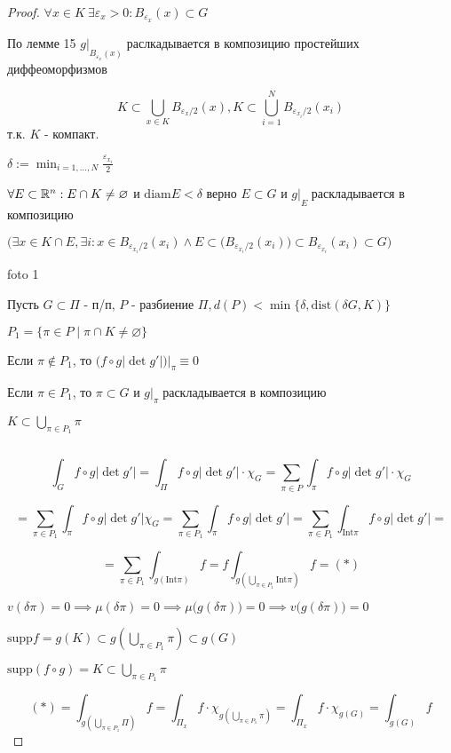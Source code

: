 \begin{proof}
        $\forall x \in K \ \exists \varepsilon_x > 0: B_{\varepsilon_x}(x) \subset G$

        По лемме 15 $g|\underset{B_{\varepsilon_x}(x) }{}$ раслкадывается в композицию простейших диффеоморфизмов
        
        $$K \subset \bigcup_{x\in K} {B_{\varepsilon_x/2}(x) }, 
        K \subset \bigcup^N_{i=1} {B_{\varepsilon_{x_i}/2}(x_i) }$$
        т.к. $K$ - компакт.

        $\displaystyle\delta := \min_{i=1,\dotsc,N} \frac{\varepsilon_{x_i}}{2}$

        $\forall E \subset \mathbb{R}^n: E \cap K \neq \varnothing $ и $\text{diam}E < \delta$ 
        верно $E \subset G$ и $g | \underset{E}{ }$ раскладывается в композицию
    
        $\Big(\exists x \in K \cap E, \exists i: x \in B_{\varepsilon_{x_i}/2}(x_i) \land
        E \subset \big(B_{\varepsilon_{x_i}/2}(x_i)\big) \subset B_{\varepsilon_{x_i}}(x_i) \subset G
        \Big)$

        foto 1

        Пусть $G \subset \Pi$ - п/п, $P$ - разбиение $\Pi, d(P) < \min \{
            \delta, \text{dist}(\delta G, K)\}$
            
        $P_1 = \{ \pi \in P \mid \pi \cap K \neq \varnothing\}$

        Если $\pi \notin P_1$, то $\big(f \circ g |\det g'|\big) | \underset{\pi}{ } \equiv 0$

        Если $\pi \in P_1$, то $\pi \subset G$ и $g|\underset{\pi}{ }$ раскладывается в композицию

        $K \subset \bigcup_{\pi \in P_1} \pi$

        \par $ $

        $$\int_{G} f\circ g |\det g'| = \int_\Pi f\circ g |\det g'| \cdot \chi_G = 
        \sum_{\pi \in P} \int_\pi f\circ g |\det g'| \cdot \chi_G$$

        $$=\sum_{\pi \in P_1} \int_\pi f \circ g |\det g'| \chi_G =  
        \sum_{\pi \in P_1} \int_\pi f\circ g |\det g'| = 
        \sum_{\pi \in P_1}\int_{\text{Int}\pi} f\circ g | \det g'| =$$

        $$
        = \sum_{\pi \in P_1} \int_{g(\text{Int}\pi)} f =
        f\int_{g(\bigcup_{\pi\in P_1}\text{Int}\pi)}f = (*)$$

        $v(\delta\pi) = 0\implies \mu(\delta\pi) = 0 \implies \mu\big(g(\delta\pi)\big) = 0 \implies v\big(g(\delta\pi)\big)=0$

        $\text{supp}f = g(K) \subset g(\bigcup_{\pi\in P_1}\pi) \subset g(G)$

        $\text{supp}(f\circ g) = K \subset \bigcup_{\pi\in P_1}\pi$

        $$(*) = \int_{g(\bigcup_{\pi\in P_1}\Pi)}f = \int_{\Pi_x}f\cdot \chi_{g(\bigcup_{\pi \in P_1}\pi)} = 
        \int_{\Pi_x}f\cdot \chi_{g(G)} = \int_{g(G)}f$$
        
    \end{proof}

